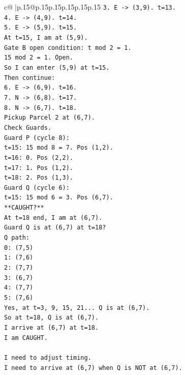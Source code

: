 \documentclass{article}
\begin{document}
{\begin{supertabular}{c@{$\;$}|p{.15\linewidth}@{}p{.15\linewidth}p{.15\linewidth}p{.15\linewidth}p{.15\linewidth}p{.15\linewidth}}
{{{\texttt{3. E {-}> (3,9). t=13.} \\
\texttt{4. E {-}> (4,9). t=14.} \\
\texttt{5. E {-}> (5,9). t=15.} \\
\texttt{At t=15, I am at (5,9).} \\
\texttt{Gate B open condition: t mod 2 = 1.} \\
\texttt{15 mod 2 = 1. Open.} \\
\texttt{So I can enter (5,9) at t=15.} \\
\texttt{Then continue:} \\
\texttt{6. E {-}> (6,9). t=16.} \\
\texttt{7. N {-}> (6,8). t=17.} \\
\texttt{8. N {-}> (6,7). t=18.} \\
\texttt{Pickup Parcel 2 at (6,7).} \\
\texttt{Check Guards.} \\
\texttt{Guard P (cycle 8):} \\
\texttt{t=15: 15 mod 8 = 7. Pos (1,2).} \\
\texttt{t=16: 0. Pos (2,2).} \\
\texttt{t=17: 1. Pos (1,2).} \\
\texttt{t=18: 2. Pos (1,3).} \\
\texttt{Guard Q (cycle 6):} \\
\texttt{t=15: 15 mod 6 = 3. Pos (6,7).} \\
\texttt{**CAUGHT?**} \\
\texttt{At t=18 end, I am at (6,7).} \\
\texttt{Guard Q is at (6,7) at t=18?} \\
\texttt{Q path:} \\
\texttt{0: (7,5)} \\
\texttt{1: (7,6)} \\
\texttt{2: (7,7)} \\
\texttt{3: (6,7)} \\
\texttt{4: (7,7)} \\
\texttt{5: (7,6)} \\
\texttt{Yes, at t=3, 9, 15, 21... Q is at (6,7).} \\
\texttt{So at t=18, Q is at (6,7).} \\
\texttt{I arrive at (6,7) at t=18.} \\
\texttt{I am CAUGHT.} \\
\\ 
\texttt{I need to adjust timing.} \\
\texttt{I need to arrive at (6,7) when Q is NOT at (6,7).} \\
}}}
\end{supertabular}}
\end{document}

